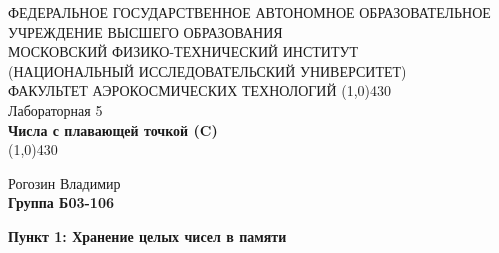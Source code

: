 \documentclass[a4paper,12pt]{article}
\begin{document}
\begin{titlepage}
\begin{center}
\large{\small ФЕДЕРАЛЬНОЕ ГОСУДАРСТВЕННОЕ АВТОНОМНОЕ ОБРАЗОВАТЕЛЬНОЕ\\ УЧРЕЖДЕНИЕ ВЫСШЕГО ОБРАЗОВАНИЯ \\ МОСКОВСКИЙ ФИЗИКО-ТЕХНИЧЕСКИЙ ИНСТИТУТ\\ (НАЦИОНАЛЬНЫЙ ИССЛЕДОВАТЕЛЬСКИЙ УНИВЕРСИТЕТ)\\ ФАКУЛЬТЕТ АЭРОКОСМИЧЕСКИХ ТЕХНОЛОГИЙ}
\vfill
\line(1,0){430}\\[1mm]
\huge{Лабораторная 5}\\
\huge\textbf{Числа с плавающей точкой (C)}\\
\line(1,0){430}\\[1mm]
\vfill
\begin{flushright}
\normalsize{Рогозин Владимир}\\
\normalsize{\textbf{Группа Б03-106}}\\
\end{flushright}
\end{center}
\end{titlepage}

\textbf{Пункт 1: Хранение целых чисел в памяти}
\end{document}
